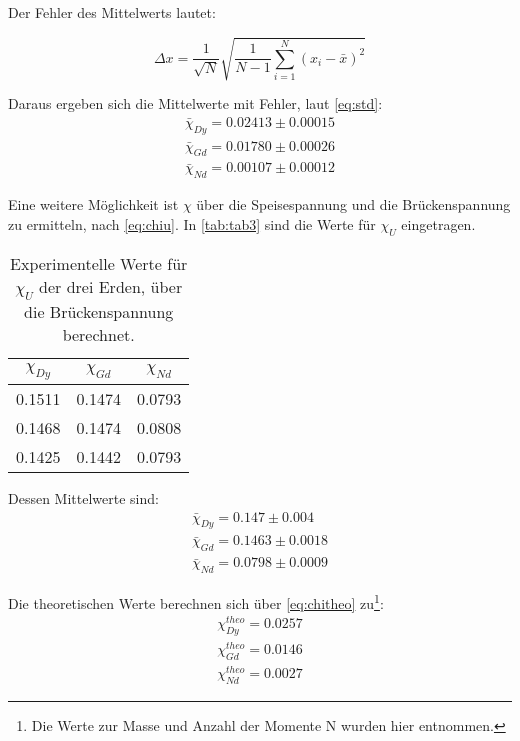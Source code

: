Der Fehler des Mittelwerts lautet:

\begin{equation}
    \Delta x = \frac{1}{\sqrt{N}}\sqrt{\frac{1}{N-1}\sum_{i=1}^N (x_i-\bar{x})^2}
    \label{eq:std}
\end{equation}

Daraus ergeben sich die Mittelwerte mit Fehler, laut \autoref{eq:std}:
\begin{align*}
  \bar{\chi}_{Dy} = 0.02413\pm 0.00015\\
  \bar{\chi}_{Gd} = 0.01780\pm 0.00026\\
  \bar{\chi}_{Nd} = 0.00107\pm 0.00012
\end{align*}

Eine weitere Möglichkeit ist $\chi$ über die Speisespannung und die Brückenspannung zu ermitteln, nach \autoref{eq:chiu}.
In \autoref{tab:tab3} sind die Werte für $\chi_U$ eingetragen.

\begin{table}
  \centering
  \caption{Experimentelle Werte für $\chi_U$ der drei Erden, über die Brückenspannung berechnet.}
  \label{tab:tab3}
  \begin{tabular}{c|c|c}
    $\chi_{Dy}$ & $\chi_{Gd}$ & $\chi_{Nd}$\\
    \midrule
    0.1511 & 0.1474 & 0.0793\\
    0.1468 & 0.1474 & 0.0808\\
    0.1425 & 0.1442 & 0.0793\\
  \end{tabular}
\end{table}

Dessen Mittelwerte sind:
\begin{align*}
  \bar{\chi}_{Dy} = 0.147\pm 0.004\\
  \bar{\chi}_{Gd} = 0.1463\pm 0.0018\\
  \bar{\chi}_{Nd} = 0.0798\pm 0.0009
\end{align*}

Die theoretischen Werte berechnen sich über \autoref{eq:chitheo} zu\footnote[1]{Die Werte zur Masse und Anzahl der Momente N wurden hier\cite{v606} entnommen.}:
\begin{align*}
  \chi_{Dy}^{theo} = 0.0257\\
  \chi_{Gd}^{theo} = 0.0146\\
  \chi_{Nd}^{theo} = 0.0027
\end{align*}